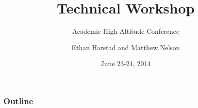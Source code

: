 \documentclass[t]{beamer}
\title{Technical Workshop}
\subtitle{Academic High Altitude Conference}
\author{Ethan Harstad and Matthew Nelson}
\institute{Stratospheric Ballooning Association}
\date{June 23-24, 2014}
\numberwithin{section}{part}
\begin{document}
\begin{frame}
	\titlepage
\end{frame}

\begin{frame}[t]
	\frametitle{Outline}
	\tableofcontents
\end{frame}






\end{document}
